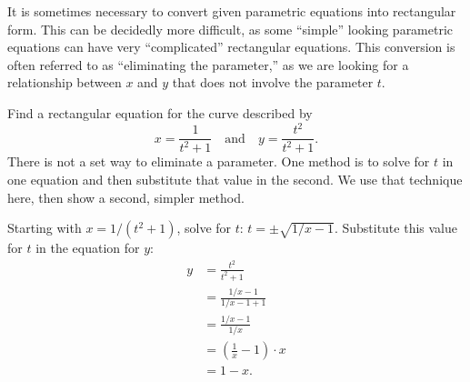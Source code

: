 It is  sometimes necessary to convert given parametric equations into rectangular form. This can be decidedly more difficult, as some ``simple'' looking parametric equations can have very ``complicated'' rectangular equations. This conversion is often referred to as ``eliminating the parameter,'' as we are looking for a relationship between $x$ and $y$ that does not involve the parameter $t$.

\begin{example}\label{ex_pareq7}%
Find a rectangular equation for the curve described by
\[x= \frac{1}{t^2+1}\quad \text{and}\quad y=\frac{t^2}{t^2+1}.\]
\solution
There is not a set way to eliminate a parameter. One method is to solve for $t$ in one equation and then substitute that value in the second. We use that technique here, then show a second, simpler method.

Starting with $x= 1/(t^2+1)$, solve for $t$: $ t = \pm\sqrt{1/x-1}$. Substitute this value for $t$ in the equation for $y$:
{\allowdisplaybreaks
\begin{align*}
 y &= \frac{t^2}{t^2 +1} \\
		&= \frac{1/x-1}{1/x-1+1} \\
		&= \frac{1/x - 1}{1/x} \\
		&= \left(\frac1x-1\right)\cdot x \\
		&= 1-x.
\end{align*}}



\end{example}
